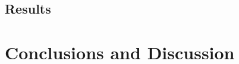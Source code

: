 \documentclass[BIT, graphvis, a4paper]{usydthesis}
\begin{document}




\section{Results} %

\chapter{Conclusions and Discussion} %

\printbibliography


\end{document}
